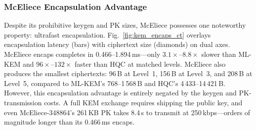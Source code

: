 \subsubsection{McEliece Encapsulation Advantage}

Despite its prohibitive keygen and PK sizes, McEliece possesses
one noteworthy property: ultrafast encapsulation.
Fig.~\ref{fig:kem_encaps_ct} overlays encapsulation latency (bars)
with ciphertext size (diamonds) on dual axes.
McEliece encaps completes in 0.466--1.894\,ms---only
$3.1\times$--$8.8\times$ slower than ML-KEM and
$96\times$--$132\times$ faster than HQC at matched levels.
McEliece also produces the smallest ciphertexts: 96\,B at Level~1,
156\,B at Level~3, and 208\,B at Level~5, compared to ML-KEM's
768--1\,568\,B and HQC's 4\,433--14\,421\,B.
However, this encapsulation advantage is entirely negated by the
keygen and PK-transmission costs.  A full KEM exchange requires
shipping the public key, and even McEliece-348864's 261\,KB PK
takes 8.4\,s to transmit at 250\,kbps---orders of magnitude longer
than its 0.466\,ms encaps.

